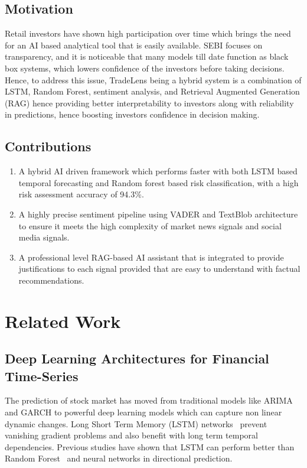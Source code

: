 \documentclass[twocolumn]{article}
\begin{document}
\subsection{Motivation}

Retail investors have shown high participation over time which brings the need for an AI based analytical tool that is easily available. SEBI focuses on transparency, and it is noticeable that many models till date function as black box systems, which lowers confidence of the investors before taking decisions. Hence, to address this issue, TradeLens being a hybrid system is a combination of LSTM, Random Forest, sentiment analysis, and Retrieval Augmented Generation (RAG) hence providing better interpretability to investors along with reliability in predictions, hence boosting investors confidence in decision making.

\subsection{Contributions}
\begin{enumerate}
    \item A hybrid AI driven framework which performs faster with both LSTM based temporal forecasting and Random forest based risk classification, with a high risk assessment accuracy of 94.3\%.
    \item A highly precise sentiment pipeline using VADER and TextBlob architecture to ensure it meets the high complexity of market news signals and social media signals.
    \item A professional level RAG-based AI assistant that is integrated to provide justifications to each signal provided that are easy to understand with factual recommendations.
\end{enumerate}

\section{Related Work}

\subsection{Deep Learning Architectures for Financial Time-Series}

The prediction of stock market has moved from traditional models like ARIMA and GARCH to powerful deep learning models which can capture non linear dynamic changes. Long Short Term Memory (LSTM) networks~\cite{hochreiter1997lstm} prevent vanishing gradient problems and also benefit with long term temporal dependencies. Previous studies have shown that LSTM can perform better than Random Forest~\cite{breiman2001rf} and neural networks in directional prediction.
\end{document}
